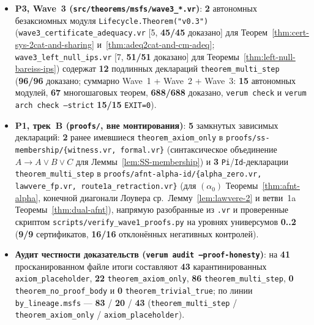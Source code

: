 \documentclass[11pt]{article}
\theoremstyle{plain}
\theoremstyle{definition}
\begin{document}
\begin{itemize}[nosep]
\item \textbf{P3, Wave~3 (\texttt{src/\allowbreak theorems/\allowbreak msfs/\allowbreak wave3\_*.vr})}: \textbf{2} автономных безаксиомных модуля \texttt{Lifecycle.\allowbreak Theorem("v0.3")} (\texttt{wave3\_\allowbreak certificate\_\allowbreak adequacy.vr} [5, \textbf{45/45} доказано] для Теорем~\ref{thm:cert-sys-2cat-and-sharing} и~\ref{thm:adeq2cat-and-cm-adeq}; \texttt{wave3\_\allowbreak left\_\allowbreak null\_\allowbreak ips.vr} [7, \textbf{51/51} доказано] для Теоремы~\ref{thm:left-null-bareiss-ips}) содержат \textbf{12} подлинных деклараций \texttt{theorem\_multi\_step} (\textbf{96/96} доказано; суммарно Wave~1 + Wave~2 + Wave~3: \textbf{15} автономных модулей, \textbf{67} многошаговых теорем, \textbf{688/688} доказано, \texttt{verum check} и \texttt{verum arch check --strict} \textbf{15/15} \texttt{EXIT=0}).
\item \textbf{P1, трек~B (\texttt{proofs/}, вне монтирования)}: \textbf{5} замкнутых зависимых деклараций: \textbf{2} ранее имевшиеся \texttt{theorem\_axiom\_only} в \texttt{proofs/\allowbreak ss-\allowbreak membership/\allowbreak \{witness.vr, formal.vr\}} (синтаксическое объединение $A \to A \vee B \vee C$ для Леммы~\ref{lem:SS-membership}) и \textbf{3} \texttt{Pi}/\texttt{Id}-декларации \texttt{theorem\_multi\_step} в \texttt{proofs/\allowbreak afnt-\allowbreak alpha-\allowbreak id/\allowbreak \{alpha\_zero.vr, lawvere\_fp.vr, route1a\_retraction.vr\}} (для $(\alpha_0)$ Теоремы~\ref{thm:afnt-alpha}, конечной диагонали Лоувера ср.\ Лемму~\ref{lem:lawvere-2} и ветви~1a Теоремы~\ref{thm:dual-afnt}), напрямую разобранные из \texttt{.vr} и проверенные скриптом \texttt{scripts/\allowbreak verify\_\allowbreak wave1\_\allowbreak proofs.py} на уровнях универсумов \textbf{0..2} (\textbf{9/9} сертификатов, \textbf{16/16} отклонённых негативных контролей).
\item \textbf{Аудит честности доказательств (\texttt{verum audit --proof-honesty})}: на \textbf{41} просканированном файле итоги составляют \textbf{43} карантинированных \texttt{axiom\_placeholder}, \textbf{22} \texttt{theorem\_axiom\_only}, \textbf{86} \texttt{theorem\_multi\_step}, \textbf{0} \texttt{theorem\_no\_proof\_body} и \textbf{0} \texttt{theorem\_trivial\_true}; по линии \texttt{by\_lineage.\allowbreak msfs} — \textbf{83} / \textbf{20} / \textbf{43} (\texttt{theorem\_multi\_step} / \texttt{theorem\_axiom\_only} / \texttt{axiom\_placeholder}).

\end{itemize}
\end{document}
